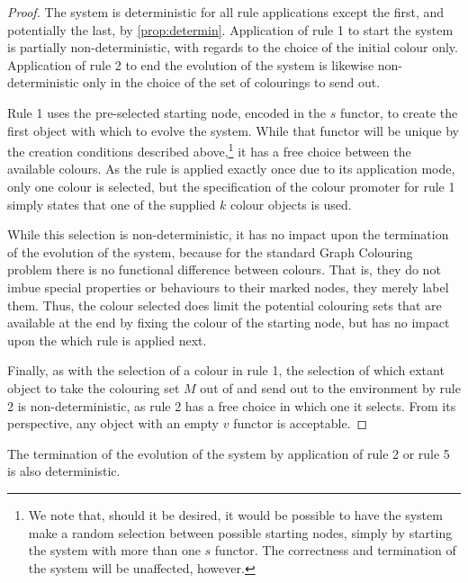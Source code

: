 \begin{proof}
The system is deterministic for all rule applications except the first, and potentially the last, by \autoref{prop:determin}.  Application of rule 1 to start the system is partially non-deterministic, with regards to the choice of the initial colour only.  Application of rule 2 to end the evolution of the system is likewise non-deterministic only in the choice of the set of colourings to send out.

Rule 1 uses the pre-selected starting node, encoded in the \(s\) functor, to create the first \bo{} object with which to evolve the system.  While that functor will be unique by the creation conditions described above,\footnote{We note that, should it be desired, it would be possible to have the system make a random selection between possible starting nodes, simply by starting the system with more than one \(s\) functor.  The correctness and termination of the system will be unaffected, however.} it has a free choice between the available colours.  As the rule is applied exactly once due to its application mode, only one colour is selected, but the specification of the colour promoter for rule 1 simply states that one of the supplied \(k\) colour objects is used.

While this selection is non-deterministic, it has no impact upon the termination of the evolution of the system, because for the standard Graph Colouring problem there is no functional difference between colours.  That is, they do not imbue special properties or behaviours to their marked nodes, they merely label them.  Thus, the colour selected does limit the potential colouring sets that are available at the end by fixing the colour of the starting node, but has no impact upon the which rule is applied next.

Finally, as with the selection of a colour in rule 1, the selection of which extant \bo{} object to take the colouring set \(M\) out of and send out to the environment by rule 2 is non-deterministic, as rule 2 has a free choice in which one it selects.  From its perspective, any \bo{} object with an empty \(v\) functor is acceptable.
\end{proof}

\begin{proposition}\label{prop:ending}
The termination of the evolution of the system by application of rule 2 or rule 5 is also deterministic.
\end{proposition}

